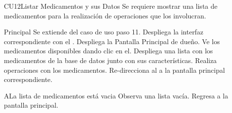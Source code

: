 \begin{UseCase}{CU12}{Listar Medicamentos y sus Datos}{
		Se requiere mostrar una lista de medicamentos para la realización de operaciones que los involucran.
	}
	\end{UseCase}
	\begin{UCtrayectoria}{Principal}
		\UCpaso Se extiende del caso de uso  paso 11.
		\UCpaso Despliega la interfaz correspondiente con el \UCactor.
		\UCpaso Despliega la  {Pantalla Principal de dueño}.
		\UCpaso[\UCactor] Ve los medicamentos disponibles dando clic en el.
		\UCpaso Despliega una lista con los medicamentos de la base de datos junto con sus características.
		\UCpaso[\UCactor] Realiza operaciones con los medicamentos.
		\UCpaso Re-direcciona al \UCactor a la pantalla principal correspondiente.
	
	\end{UCtrayectoria}


		\begin{UCtrayectoriaA}{A}{La lista de medicamentos está vacia}
			\UCpaso[\UCactor] Observa una lista vacía.
			\UCpaso[\UCactor] Regresa a la pantalla principal.
		\end{UCtrayectoriaA}

